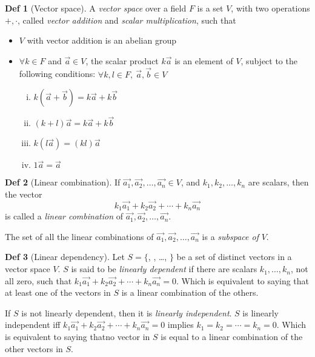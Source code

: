 \documentclass{article}
\theoremstyle{definition}
\newtheorem{definition}{Def}[section]
\begin{document}
\begin{definition}[Vector space]
    A \emph{vector space} over a field $F$ is a set $V$, with two operations $+, \cdot$, called \emph{vector addition} and \emph{scalar multiplication}, such that

    \begin{itemize}
	\item $V$ with vector addition is an abelian group
	\item $\forall k \in F$ and $\overrightarrow{a} \in V$, the scalar product $k \overrightarrow{a}$ is an element of $V$, subject to the following conditions:
	    $\forall k, l \in F,~\overrightarrow{a},\overrightarrow{b} \in V$
	    \begin{enumerate}[i.]
		\item $k(\overrightarrow{a} + \overrightarrow{b}) = k\overrightarrow{a} + k\overrightarrow{b}$
		\item $(k + l)\overrightarrow{a} = k\overrightarrow{a} + k\overrightarrow{b}$
		\item $k(l\overrightarrow{a}) = (kl)\overrightarrow{a}$
		\item $1 \overrightarrow{a} = \overrightarrow{a}$
	    \end{enumerate}
    \end{itemize}
\end{definition}

\begin{definition}[Linear combination]
    If $\overrightarrow{a_1}, \overrightarrow{a_2}, \ldots, \overrightarrow{a_n} \in V$, and $k_1, k_2, \ldots, k_n$ are scalars, then the vector
    $$k_1 \overrightarrow{a_1} + k_2 \overrightarrow{a_2} + \cdots + k_n \overrightarrow{a_n}$$
    is called a \emph{linear combination} of $\overrightarrow{a_1}, \overrightarrow{a_2}, \ldots, \overrightarrow{a_n}$.

    The set of all the linear combinations of $\overrightarrow{a_1}, \overrightarrow{a_2}, \ldots, \overrightarrow{a_n}$ is a \emph{subspace of} $V$.
\end{definition}

\begin{definition}[Linear dependency]
    Let $S = \{$, , \ldots, $\}$ be a set of distinct vectors in a vector space $V$. $S$ is said to be \emph{linearly dependent} if there are scalars $k_1, \ldots, k_n$, not all zero, such that $k_1 \overrightarrow{a_1} + k_2 \overrightarrow{a_2} + \cdots + k_n \overrightarrow{a_n} = 0$.
    Which is equivalent to saying that at least one of the vectors in $S$ is a linear combination of the others.

    If $S$ is not linearly dependent, then it is \emph{linearly independent}. $S$ is linearly independent iff $k_1 \overrightarrow{a_1} + k_2 \overrightarrow{a_2} + \cdots + k_n \overrightarrow{a_n}=0$ implies $k_1 = k_2 = \cdots =  k_n =0$.
    Which is equivalent to saying thatno vector in $S$ is equal to a linear combination of the other vectors in $S$.
\end{definition}
\end{document}
